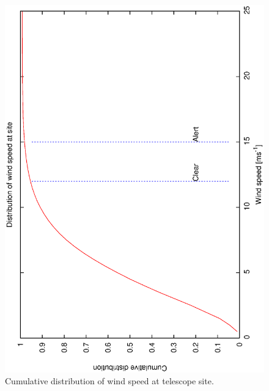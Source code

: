 \begin{figure}[htbp]
\begin{center}
    \includegraphics[scale=0.4, angle=-90]{figures/ecs/ws_25_cum.dat.eps}
\caption[Cumulative distribution of wind speed at telescope site.]
{Cumulative distribution of wind speed at telescope site.}
\end{center} 
 \label{fig:met_windspeed_cum_dist}
\end{figure}

